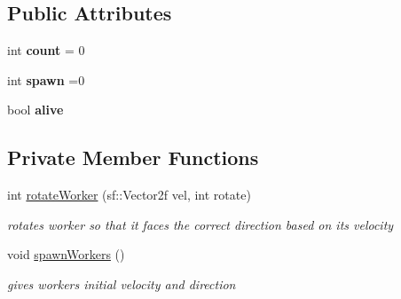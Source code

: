 \subsection*{Public Attributes}
\begin{DoxyCompactItemize}
\item 
\mbox{\label{class_worker_ad640050b40d834102eddd619d1a12ebf}} 
int {\bfseries count} = 0
\item 
\mbox{\label{class_worker_a7c2d73a1a23ed1a876056d159e811ce4}} 
int {\bfseries spawn} =0
\item 
\mbox{\label{class_worker_af93f164ed5eb8b1c3421fa7a23762a2e}} 
bool {\bfseries alive}
\end{DoxyCompactItemize}
\subsection*{Private Member Functions}
\begin{DoxyCompactItemize}
\item 
int \mbox{\hyperlink{class_worker_a4bc0c766d4aaddc7a564d8601ee114e4}{rotate\+Worker}} (sf\+::\+Vector2f vel, int rotate)
\begin{DoxyCompactList}\small\item\em rotates worker so that it faces the correct direction based on its velocity \end{DoxyCompactList}\item 
void \mbox{\hyperlink{class_worker_adc379fc84951cfc33613dcfcae06bc98}{spawn\+Workers}} ()
\begin{DoxyCompactList}\small\item\em gives workers initial velocity and direction \end{DoxyCompactList}\end{DoxyCompactItemize}
